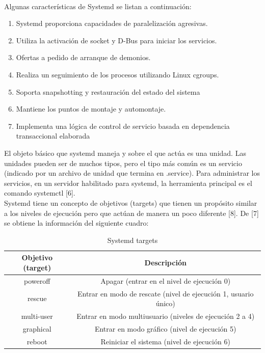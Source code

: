 \documentclass[conference]{IEEEtran}
\begin{document}
\\Algunas características de Systemd se listan a continuación:
\begin{enumerate}
    \item Systemd proporciona capacidades de paralelización agresivas.
    \item Utiliza la activación de socket y D-Bus para iniciar los servicios.
    \item Ofertas a pedido de arranque de demonios.
    \item Realiza un seguimiento de los procesos utilizando Linux cgroups.
    \item Soporta snapshotting y restauración del estado del sistema
    \item Mantiene los puntos de montaje y automontaje.
    \item Implementa una lógica de control de servicio basada en dependencia transaccional elaborada
\end{enumerate}
El objeto básico que systemd maneja y sobre el que actúa es una unidad. Las unidades pueden ser de muchos tipos, pero el tipo más común es un servicio (indicado por un archivo de unidad que termina en .service). Para administrar los servicios, en un servidor habilitado para systemd, la herramienta principal es el comando systemctl [6].
\\Systemd tiene un concepto de objetivos (targets) que tienen un propósito similar a los niveles de ejecución pero que actúan de manera un poco diferente [8]. De [7] se obtiene la información del siguiente cuadro:

\begin{table}[ht]
\centering
\caption{Systemd targets}
\begin{tabular}{|c|c|}
\hline
\textbf{Objetivo (target)} & \textbf{Descripción} \\ \hline
poweroff & Apagar (entrar en el nivel de ejecución 0) \\ \hline
rescue & Entrar en modo de rescate (nivel de ejecución 1, usuario único)\\ \hline
multi-user & Entrar en modo multiusuario (niveles de ejecución 2 a 4) \\ \hline
graphical & Entrar en modo gráfico (nivel de ejecución 5) \\ \hline
reboot & Reiniciar el sistema (nivel de ejecución 6)\\ \hline
\end{tabular}
\end{table}
\end{document}

